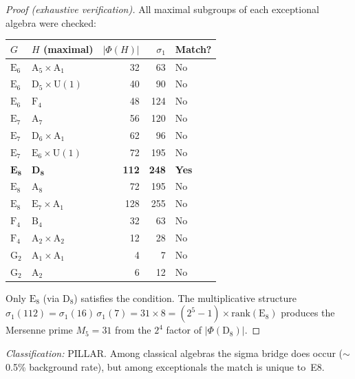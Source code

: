 \documentclass[aps,prd,twocolumn,superscriptaddress,floatfix,nofootinbib]{revtex4-2}
\theoremstyle{definition}
\theoremstyle{remark}
\begin{document}
\begin{proof}[Proof (exhaustive verification)]
All maximal subgroups of each exceptional algebra were checked:

\smallskip
\begin{center}
\small
\begin{tabular}{llrrl}
\toprule
$G$ & $H$ (maximal) & $|\Phi(H)|$ & $\sigma_1$ & Match? \\
\midrule
$\mathrm{E}_6$ & $\mathrm{A}_5 \times \mathrm{A}_1$ & 32 & 63  & No \\
$\mathrm{E}_6$ & $\mathrm{D}_5 \times \mathrm{U}(1)$ & 40 & 90  & No \\
$\mathrm{E}_6$ & $\mathrm{F}_4$ & 48 & 124 & No \\
$\mathrm{E}_7$ & $\mathrm{A}_7$ & 56 & 120 & No \\
$\mathrm{E}_7$ & $\mathrm{D}_6 \times \mathrm{A}_1$ & 62 & 96  & No \\
$\mathrm{E}_7$ & $\mathrm{E}_6 \times \mathrm{U}(1)$ & 72 & 195 & No \\
\rowcolor{green!15}
$\mathbf{E_8}$ & $\mathbf{D_8}$ & \textbf{112} & \textbf{248} & \textbf{Yes} \\
$\mathrm{E}_8$ & $\mathrm{A}_8$ & 72 & 195 & No \\
$\mathrm{E}_8$ & $\mathrm{E}_7 \times \mathrm{A}_1$ & 128 & 255 & No \\
$\mathrm{F}_4$ & $\mathrm{B}_4$ & 32 & 63  & No \\
$\mathrm{F}_4$ & $\mathrm{A}_2 \times \mathrm{A}_2$ & 12 & 28  & No \\
$\mathrm{G}_2$ & $\mathrm{A}_1 \times \mathrm{A}_1$ & 4  & 7   & No \\
$\mathrm{G}_2$ & $\mathrm{A}_2$ & 6  & 12  & No \\
\bottomrule
\end{tabular}
\end{center}
\smallskip

\noindent Only $\mathrm{E}_8$ (via $\mathrm{D}_8$) satisfies the
condition.  The multiplicative structure
$\sigma_1(112) = \sigma_1(16)\,\sigma_1(7) = 31 \times 8 =
(2^5 - 1) \times \mathrm{rank}(\mathrm{E}_8)$ produces the Mersenne
prime $M_5 = 31$ from the $2^4$ factor of $|\Phi(\mathrm{D}_8)|$.
\end{proof}

\noindent\textit{Classification:} PILLAR\@.  Among classical algebras the
sigma bridge does occur ($\sim$0.5\% background rate), but among
exceptionals the match is unique to~E8.
\end{document}
